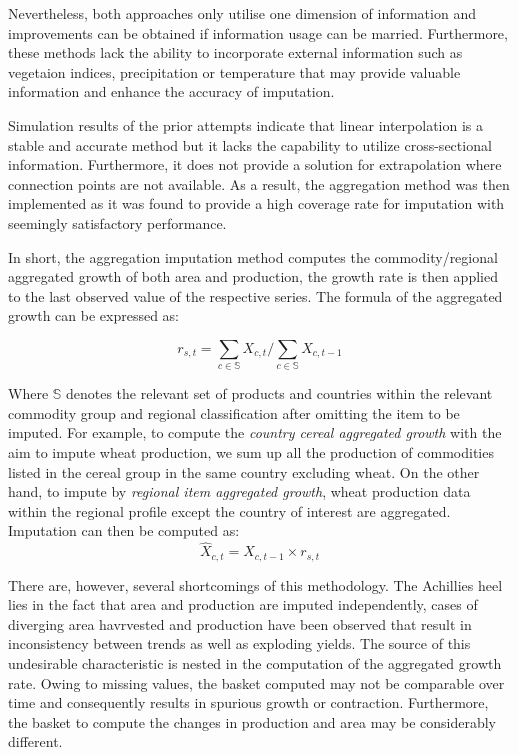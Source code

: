 \documentclass[nojss]{jss}\usepackage{graphicx, color}
\begin{document}
Nevertheless, both approaches only utilise one dimension of
information and improvements can be obtained if information usage
can be married. Furthermore, these methods lack the ability to
incorporate external information such as vegetaion indices,
precipitation or temperature that may provide valuable information and
enhance the accuracy of imputation.

Simulation results of the prior attempts indicate that linear
interpolation is a stable and accurate method but it lacks the
capability to utilize cross-sectional information. Furthermore, it
does not provide a solution for extrapolation where connection points
are not available. As a result, the aggregation method was then
implemented as it was found to provide a high coverage rate for
imputation with seemingly satisfactory performance.

In short, the aggregation imputation method computes the
commodity/regional aggregated growth of both area and production, the
growth rate is then applied to the last observed value of the
respective series. The formula of the aggregated growth can be
expressed as:

\begin{equation}
  \label{eq:aggregateGrowth}
  r_{s, t} = \sum_{c \in \mathbb{S}} X_{c, t}/\sum_{c \in \mathbb{S}} X_{c, t-1}
\end{equation}

Where $\mathbb{S}$ denotes the relevant set of products and countries
within the relevant commodity group and regional classification after
omitting the item to be imputed. For example, to compute the
\textit{country cereal aggregated growth} with the aim to impute wheat
production, we sum up all the production of commodities listed in the
cereal group in the same country excluding wheat. On the other hand,
to impute by \textit{regional item aggregated growth}, wheat
production data within the regional profile except the country of
interest are aggregated.\\


Imputation can then be computed as:
\begin{equation}
  \hat{X}_{c, t} = X_{c, t-1} \times r_{s, t}
\end{equation}
  

There are, however, several shortcomings of this methodology. The
Achillies heel lies in the fact that area and production are imputed
independently, cases of diverging area havrvested and production have
been observed that result in inconsistency between trends as well as
exploding yields. The source of this undesirable characteristic is
nested in the computation of the aggregated growth rate. Owing to
missing values, the basket computed may not be comparable over time
and consequently results in spurious growth or
contraction. Furthermore, the basket to compute the changes in
production and area may be considerably different.
\end{document}
